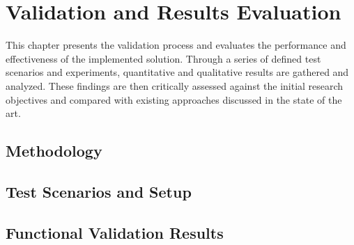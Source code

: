 \chapter{Validation and Results Evaluation}%
\label{chapter:validation-and-results-evaluation}

\begin{introduction}
This chapter presents the validation process and evaluates the performance and effectiveness of the implemented solution. Through a series of defined test scenarios and experiments, quantitative and qualitative results are gathered and analyzed. These findings are then critically assessed against the initial research objectives and compared with existing approaches discussed in the state of the art.
\end{introduction}

\section{Methodology}



\section{Test Scenarios and Setup}



\section{Functional Validation Results}



